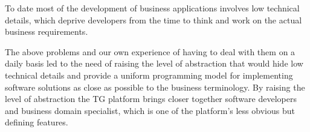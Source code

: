   To date most of the development of business applications involves low technical details, which deprive developers from the time to think and work on the actual business requirements.
  
  The above problems and our own experience of having to deal with them on a daily basis led to the need of raising the level of abstraction that would hide low technical details and provide a uniform programming model for implementing software solutions as close as possible to the business terminology.
  By raising the level of abstraction the TG platform brings closer together software developers and business domain specialist, which is one of the platform's less obvious but defining features.
